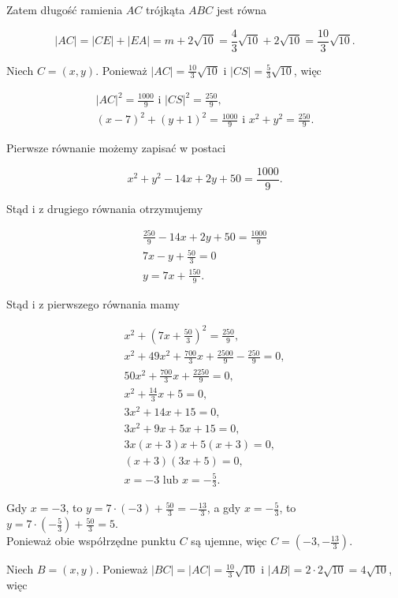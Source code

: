 \documentclass[10pt]{article}
\begin{document}
Zatem długość ramienia $A C$ trójkąta $A B C$ jest równa

$$
|A C|=|C E|+|E A|=m+2 \sqrt{10}=\frac{4}{3} \sqrt{10}+2 \sqrt{10}=\frac{10}{3} \sqrt{10} .
$$

Niech $C=(x, y)$. Ponieważ $|A C|=\frac{10}{3} \sqrt{10}$ i $|C S|=\frac{5}{3} \sqrt{10}$, więc

$$
\begin{gathered}
|A C|^{2}=\frac{1000}{9} \text { i }|C S|^{2}=\frac{250}{9}, \\
(x-7)^{2}+(y+1)^{2}=\frac{1000}{9} \text { i } x^{2}+y^{2}=\frac{250}{9} .
\end{gathered}
$$

Pierwsze równanie możemy zapisać w postaci

$$
x^{2}+y^{2}-14 x+2 y+50=\frac{1000}{9} .
$$

Stąd i z drugiego równania otrzymujemy

$$
\begin{gathered}
\frac{250}{9}-14 x+2 y+50=\frac{1000}{9} \\
7 x-y+\frac{50}{3}=0 \\
y=7 x+\frac{150}{9} .
\end{gathered}
$$

Stąd i z pierwszego równania mamy

$$
\begin{gathered}
x^{2}+\left(7 x+\frac{50}{3}\right)^{2}=\frac{250}{9}, \\
x^{2}+49 x^{2}+\frac{700}{3} x+\frac{2500}{9}-\frac{250}{9}=0, \\
50 x^{2}+\frac{700}{3} x+\frac{2250}{9}=0, \\
x^{2}+\frac{14}{3} x+5=0, \\
3 x^{2}+14 x+15=0, \\
3 x^{2}+9 x+5 x+15=0, \\
3 x(x+3) x+5(x+3)=0, \\
(x+3)(3 x+5)=0, \\
x=-3 \text { lub } x=-\frac{5}{3} .
\end{gathered}
$$

Gdy $x=-3$, to $y=7 \cdot(-3)+\frac{50}{3}=-\frac{13}{3}$, a gdy $x=-\frac{5}{3}$, to $y=7 \cdot\left(-\frac{5}{3}\right)+\frac{50}{3}=5$.\\
Ponieważ obie współrzędne punktu $C$ są ujemne, więc $C=\left(-3,-\frac{13}{3}\right)$.

Niech $B=(x, y)$. Ponieważ $|B C|=|A C|=\frac{10}{3} \sqrt{10}$ i $|A B|=2 \cdot 2 \sqrt{10}=4 \sqrt{10}$, więc
\end{document}
